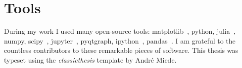 \endgroup


\newpage
\section*{Tools}
During my work I used many open-source tools: matplotlib~\cite{Hunter2007}, python, julia~\cite{julia}, numpy, scipy~\cite{scipy}, jupyter~\cite{jupyter}, pyqtgraph, ipython~\cite{ipython}, pandas~\cite{pandas}.
I am grateful to the countless contributors to these remarkable pieces of software. This thesis was typeset using the \emph{classicthesis} template by André Miede.
